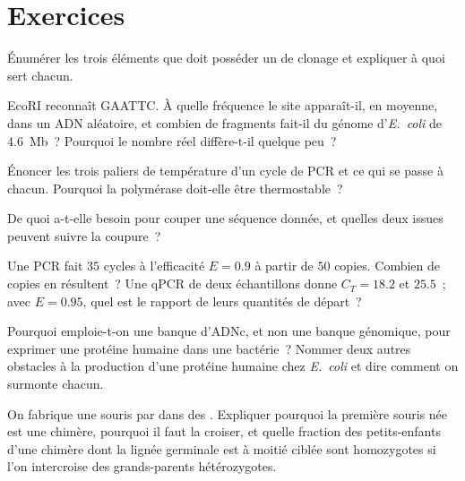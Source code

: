 \section{Exercices}

\begin{exercise}[$\star$]\label{exo:b3:genetic-engineering:1}
Énumérer les trois éléments que doit posséder un  de clonage et
expliquer à quoi sert chacun.
\end{exercise}

\begin{exercise}[$\star$]\label{exo:b3:genetic-engineering:2}
EcoRI reconnaît GAATTC. À quelle fréquence le site apparaît-il, en
moyenne, dans un ADN aléatoire, et combien de fragments fait-il du
génome d'\emph{E.~coli} de \qty{4.6}{Mb}~? Pourquoi le nombre réel
diffère-t-il quelque peu~?
\end{exercise}

\begin{exercise}[$\star$]\label{exo:b3:genetic-engineering:3}
Énoncer les trois paliers de température d'un cycle de PCR et ce qui se
passe à chacun. Pourquoi la polymérase doit-elle être thermostable~?
\end{exercise}

\begin{exercise}[$\star$]\label{exo:b3:genetic-engineering:4}
De quoi  a-t-elle besoin pour couper une séquence donnée, et
quelles deux issues peuvent suivre la coupure~?
\end{exercise}

\begin{exercise}[$\star\star$]\label{exo:b3:genetic-engineering:5}
Une PCR fait $35$ cycles à l'efficacité $E = 0.9$ à partir de $50$
copies. Combien de copies en résultent~? Une qPCR de deux échantillons
donne $C_{T} = 18.2$ et $25.5$~; avec $E = 0.95$, quel est le rapport
de leurs quantités de départ~?
\end{exercise}

\begin{exercise}[$\star\star$]\label{exo:b3:genetic-engineering:6}
Pourquoi emploie-t-on une banque d'ADNc, et non une banque génomique,
pour exprimer une protéine humaine dans une bactérie~? Nommer deux
autres obstacles à la production d'une protéine humaine chez
\emph{E.~coli} et dire comment on surmonte chacun.
\end{exercise}

\begin{exercise}[$\star\star$]\label{exo:b3:genetic-engineering:7}
On fabrique une souris  par  dans des . Expliquer pourquoi la première souris née est
une chimère, pourquoi il faut la croiser, et quelle fraction des
petits-enfants d'une chimère dont la lignée germinale est à moitié
ciblée sont homozygotes  si l'on intercroise des grands-parents
hétérozygotes.
\end{exercise}

